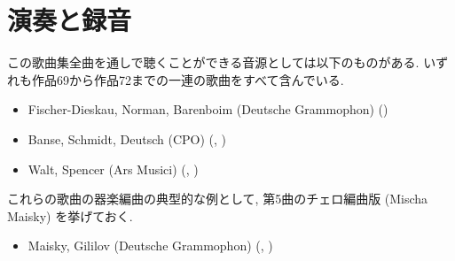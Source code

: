 
\section*{演奏と録音}


この歌曲集全曲を通しで聴くことができる音源としては以下のものがある. いずれも作品69から作品72までの一連の歌曲をすべて含んでいる.
\begin{itemize}
	\item Fischer-Dieskau, Norman, Barenboim (Deutsche Grammophon) ()
	\item Banse, Schmidt, Deutsch (CPO) (, )
	\item Walt, Spencer (Ars Musici) (, )
\end{itemize}
これらの歌曲の器楽編曲の典型的な例として, 第5曲のチェロ編曲版 (Mischa Maisky) を挙げておく. 
\begin{itemize}
	\item Maisky, Gililov (Deutsche Grammophon) (, )
\end{itemize}
